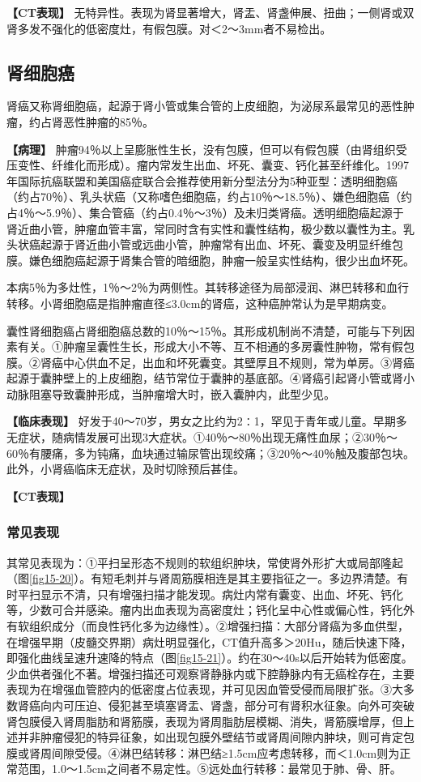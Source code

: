 \textbf{【CT表现】}
无特异性。表现为肾显著增大，肾盂、肾盏伸展、扭曲；一侧肾或双肾多发不强化的低密度灶，有假包膜。对＜2～3mm者不易检出。

\subsection{肾细胞癌}

肾癌又称肾细胞癌，起源于肾小管或集合管的上皮细胞，为泌尿系最常见的恶性肿瘤，约占肾恶性肿瘤的85％。

\textbf{【病理】}
肿瘤94％以上呈膨胀性生长，没有包膜，但可以有假包膜（由肾组织受压变性、纤维化而形成）。瘤内常发生出血、坏死、囊变、钙化甚至纤维化。1997年国际抗癌联盟和美国癌症联合会推荐使用新分型法分为5种亚型：透明细胞癌（约占70％）、乳头状癌（又称嗜色细胞癌，约占10％～18.5％）、嫌色细胞癌（约占4％～5.9％）、集合管癌（约占0.4％～3％）及未归类肾癌。透明细胞癌起源于肾近曲小管，肿瘤血管丰富，常同时含有实性和囊性结构，极少数以囊性为主。乳头状癌起源于肾近曲小管或远曲小管，肿瘤常有出血、坏死、囊变及明显纤维包膜。嫌色细胞癌起源于肾集合管的暗细胞，肿瘤一般呈实性结构，很少出血坏死。

本病5％为多灶性，1％～2％为两侧性。其转移途径为局部浸润、淋巴转移和血行转移。小肾细胞癌是指肿瘤直径≤3.0cm的肾癌，这种癌肿常认为是早期病变。

囊性肾细胞癌占肾细胞癌总数的10％～15％。其形成机制尚不清楚，可能与下列因素有关。①肿瘤呈囊性生长，形成大小不等、互不相通的多房囊性肿物，常有假包膜。②肾癌中心供血不足，出血和坏死囊变。其壁厚且不规则，常为单房。③肾癌起源于囊肿壁上的上皮细胞，结节常位于囊肿的基底部。④肾癌引起肾小管或肾小动脉阻塞导致囊肿形成，当肿瘤增大时，嵌入囊肿内，此型少见。

\textbf{【临床表现】}
好发于40～70岁，男女之比约为2∶1，罕见于青年或儿童。早期多无症状，随病情发展可出现3大症状。①40％～80％出现无痛性血尿；②30％～60％有腰痛，多为钝痛，血块通过输尿管出现绞痛；③20％～40％触及腹部包块。此外，小肾癌临床无症状，及时切除预后甚佳。

\textbf{【CT表现】}

\subsubsection{常见表现}

其常见表现为：①平扫呈形态不规则的软组织肿块，常使肾外形扩大或局部隆起（图\ref{fig15-20}）。有短毛刺并与肾周筋膜相连是其主要指征之一。多边界清楚。有时平扫显示不清，只有增强扫描才能发现。病灶内常有囊变、出血、坏死、钙化等，少数可合并感染。瘤内出血表现为高密度灶；钙化呈中心性或偏心性，钙化外有软组织成分（而良性钙化多为边缘性）。②增强扫描：大部分肾癌为多血供型，在增强早期（皮髓交界期）病灶明显强化，CT值升高多＞20Hu，随后快速下降，即强化曲线呈速升速降的特点（图\ref{fig15-21}）。约在30～40s以后开始转为低密度。少血供者强化不著。增强扫描还可观察肾静脉内或下腔静脉内有无癌栓存在，主要表现为在增强血管腔内的低密度占位表现，并可见因血管受侵而局限扩张。③大多数肾癌向内可压迫、侵犯甚至填塞肾盂、肾盏，部分可有肾积水征象。向外可突破肾包膜侵入肾周脂肪和肾筋膜，表现为肾周脂肪层模糊、消失，肾筋膜增厚，但上述并非肿瘤侵犯的特异征象，如出现包膜外壁结节或肾周间隙内肿块，则可肯定包膜或肾周间隙受侵。④淋巴结转移：淋巴结≥1.5cm应考虑转移，而＜1.0cm则为正常范围，1.0～1.5cm之间者不易定性。⑤远处血行转移：最常见于肺、骨、肝。

